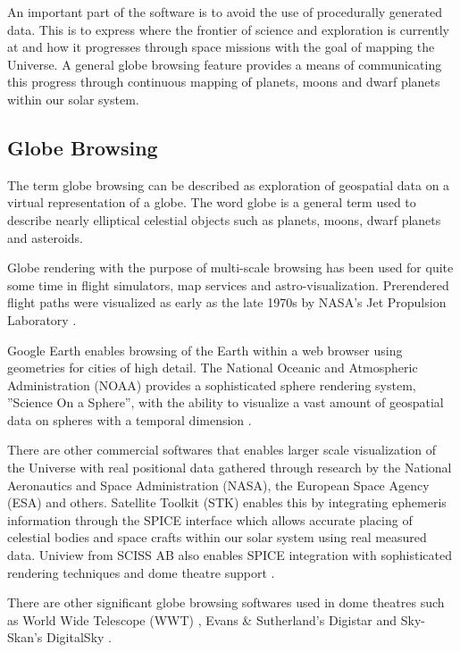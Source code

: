 An important part of the software is to avoid the use of procedurally generated data. This is to express where the frontier of science and exploration is currently at and how it progresses through space missions with the goal of mapping the Universe. A general globe browsing feature provides a means of communicating this progress through continuous mapping of planets, moons and dwarf planets within our solar system.

\subsection{Globe Browsing}

The term globe browsing can be described as exploration of geospatial data on a virtual representation of a globe. The word globe is a general term used to describe nearly elliptical celestial objects such as planets, moons, dwarf planets and asteroids.

Globe rendering with the purpose of multi-scale browsing has been used for quite some time in flight simulators, map services and astro-visualization. Prerendered flight paths were visualized as early as the late 1970s by NASA's Jet Propulsion Laboratory \cite{cozzi11}. 

Google Earth \cite{googlemaps} enables browsing of the Earth within a web browser using geometries for cities of high detail. The National Oceanic and Atmospheric Administration (NOAA) provides a sophisticated sphere rendering system, ''Science On a Sphere'', with the ability to visualize a vast amount of geospatial data on spheres with a temporal dimension \cite{sos}.

There are other commercial softwares that enables larger scale visualization of the Universe with real positional data gathered through research by the National Aeronautics and Space Administration (NASA), the European Space Agency (ESA) and others. Satellite Toolkit (STK) enables this by integrating ephemeris information through the SPICE interface \cite{spice} which allows accurate placing of celestial bodies and space crafts within our solar system using real measured data. Uniview from SCISS AB also enables SPICE integration with sophisticated rendering techniques and dome theatre support \cite{uniview}.

There are other significant globe browsing softwares used in dome theatres such as World Wide Telescope (WWT) \cite{wwt}, Evans \& Sutherland's Digistar \cite{digistar} and Sky-Skan's DigitalSky \cite{digitalsky}.


